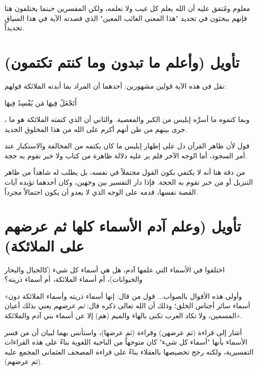 \begin{fawaid}
معلوم ومُتفق عليه أن الله يعلم كل غيب ولا نعلمه، ولكن المفسرين حينما يختلفون هنا فإنهم يبحثون في تحديد "هذا المعنى الغائب المعين" الذي قصدته الآية في هذا السياق تحديداً.
\end{fawaid}

\separator

\section{تأويل (وأعلم ما تبدون وما كنتم تكتمون)}
نقل  في هذه الآية قولين مشهورين: أحدهما أن المراد بما أبدته الملائكة قولهم: \begin{ayah}أَتَجْعَلُ فِيهَا مَن يُفْسِدُ فِيهَا\end{ayah}، وبما كتموه ما أسرَّه إبليس من الكبر والمعصية. والثاني أن الذي كتمته الملائكة هو ما جرى بينهم من ظن أنهم أكرم على الله من هذا المخلوق الجديد.

 قول  لأن ظاهر القرآن دل على إظهار إبليس ما كان يكتمه من المخالفة والاستكبار عند أمر السجود، أما الوجه الآخر فلم ير عليه دلالة ظاهرة من كتاب ولا خبر تقوم به حجة.

\begin{fawaid}
من دقة  هنا أنه لا يكتفي بكون القول محتملاً في نفسه، بل يطلب له شاهداً من ظاهر التنزيل أو من خبر تقوم به الحجة. فإذا دار التفسير بين وجهين، وكان أحدهما تؤيده آيات القصة نفسها، قدمه على الوجه الذي لا يعدو أن يكون احتمالاً مجرداً.
\end{fawaid}

\separator

\section{تأويل (وعلم آدم الأسماء كلها ثم عرضهم على الملائكة)}
اختلفوا في الأسماء التي علمها آدم، هل هي أسماء كل شيء (كالجبال والبحار والحيوانات)، أم أسماء الملائكة، أم أسماء ذريته؟

 «وأولى هذه الأقوال بالصواب... قول من قال: إنها أسماء ذريته وأسماء الملائكة دون أسماء سائر أجناس الخلق؛ وذلك أن الله تعالى ذكره قال: \textit{ثم عرضهم} يعني بذلك أعيان المسمين، ولا تكاد العرب تكنى بالهاء والميم (هم) إلا عن أسماء بني آدم والملائكة».

\begin{fawaid}
أشار  إلى قراءة  (ثم عرضهن) وقراءة  (ثم عرضها)، واستأنس بهما لبيان أن من فسر الأسماء بأنها "أسماء كل شيء" كان متوجهاً من الناحية اللغوية بناءً على هذه القراءات التفسيرية، ولكنه رجح تخصيصها بالعقلاء بناءً على قراءة المصحف العثماني المجمع عليه (ثم عرضهم).
\end{fawaid}

